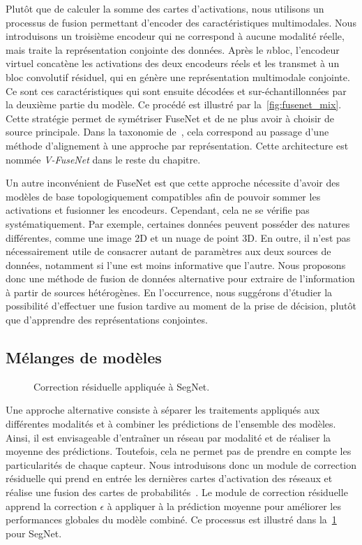 Plutôt que de calculer la somme des cartes d'activations, nous utilisons un processus de fusion permettant d'encoder des caractéristiques multimodales. Nous introduisons un troisième encodeur qui ne correspond à aucune modalité réelle, mais traite la représentation conjointe des données. Après le $n$\ieme bloc, l'encodeur virtuel concatène les activations des deux encodeurs réels et les transmet à un bloc convolutif résiduel, qui en génère une représentation multimodale conjointe. Ce sont ces caractéristiques qui sont ensuite décodées et sur-échantillonnées par la deuxième partie du modèle. Ce procédé est illustré par la~\cref{fig:fusenet_mix}. Cette stratégie permet de symétriser FuseNet et de ne plus avoir à choisir de source principale. Dans la taxonomie de~\citet{baltrusaitis_multimodal_2017}, cela correspond au passage d'une méthode d'alignement à une approche par représentation. Cette architecture est nommée \emph{V-FuseNet} dans le reste du chapitre.

Un autre inconvénient de FuseNet est que cette approche nécessite d'avoir des modèles de base topologiquement compatibles afin de pouvoir sommer les activations et fusionner les encodeurs. Cependant, cela ne se vérifie pas systématiquement. Par exemple, certaines données peuvent posséder des natures différentes, comme une image 2D et un nuage de point 3D. En outre, il n'est pas nécessairement utile de consacrer autant de paramètres aux deux sources de données, notamment si l'une est moins informative que l'autre. Nous proposons donc une méthode de fusion de données alternative pour extraire de l'information à partir de sources hétérogènes. En l'occurrence, nous suggérons d'étudier la possibilité d'effectuer une fusion tardive au moment de la prise de décision, plutôt que d'apprendre des représentations conjointes.

\subsection{Mélanges de modèles}

\begin{figure}[h]
    \resizebox{\textwidth}{!}{}
    \caption{Correction résiduelle appliquée à SegNet.}
    \label{fig:residual_correction}
\end{figure}

Une approche alternative consiste à séparer les traitements appliqués aux différentes modalités et à combiner les prédictions de l'ensemble des modèles. Ainsi, il est envisageable d'entraîner un réseau par modalité et de réaliser la moyenne des prédictions. Toutefois, cela ne permet pas de prendre en compte les particularités de chaque capteur. Nous introduisons donc un module de correction résiduelle qui prend en entrée les dernières cartes d'activation des réseaux et réalise une fusion des cartes de probabilités~\cite{audebert_semantic_2016}. Le module de correction résiduelle apprend la correction $\epsilon$ à appliquer à la prédiction moyenne pour améliorer les performances globales du modèle combiné. Ce processus est illustré dans la~\cref{fig:residual_correction} pour SegNet.

